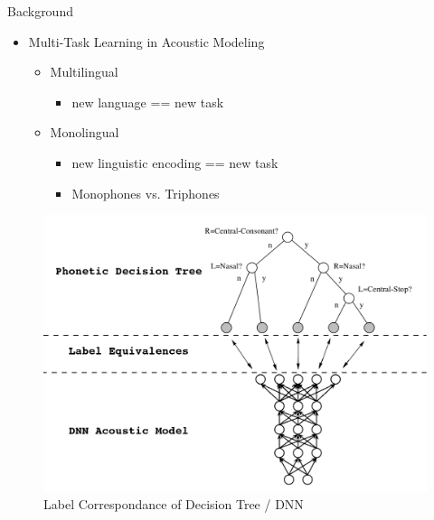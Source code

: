 \documentclass[final]{beamer} %
\begin{document}
\begin{frame}
\begin{columns}
\begin{column}{0.23\textwidth}
{        \vfill
        
        \begin{block}{\boxnumber Background}
          \begin{itemize}
          \item Multi-Task Learning in Acoustic Modeling
            \begin{itemize}
            \item Multilingual
              \begin{itemize}
              \item new language == new task
              \end{itemize}
            \item Monolingual
              \begin{itemize}
              \item new linguistic encoding == new task
                \item Monophones vs. Triphones
              \end{itemize}
            \end{itemize}     
          \end{itemize}
        \end{block}

        \vfill

        \begin{figure}[!htbp]
          \centering
          \includegraphics[width=\linewidth]{figs/tree-net.png}
          \caption{Label Correspondance of Decision Tree / DNN }
          \label{fig:mtl-dnn}
          \endminipage\hfill
        \end{figure}

}
\end{column}
\end{columns}
\end{frame}
\end{document}
